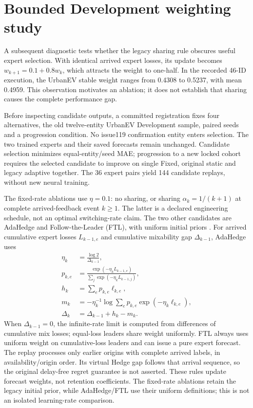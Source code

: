 \documentclass[pdflatex,iicol,sn-mathphys-num]{sn-jnl}
\begin{document}
\FloatBarrier
\section{Bounded Development weighting study}\label{sec:weightfollowup}
A subsequent diagnostic tests whether the legacy sharing rule obscures useful expert selection. With identical arrived expert losses, its update becomes $w_{k+1}=0.1+0.8w_k$, which attracts the weight to one-half. In the recorded 46-ID execution, the UrbanEV stable weight ranges from 0.4308 to 0.5237, with mean 0.4959. This observation motivates an ablation; it does not establish that sharing causes the complete performance gap.

Before inspecting candidate outputs, a committed registration fixes four alternatives, the old twelve-entity UrbanEV Development sample, paired seeds and a progression condition. No issue119 confirmation entity enters selection. The two trained experts and their saved forecasts remain unchanged. Candidate selection minimizes equal-entity/seed MAE; progression to a new locked cohort requires the selected candidate to improve on single Fixed, original static and legacy adaptive together. The 36 expert pairs yield 144 candidate replays, without new neural training.

The fixed-rate ablations use $\eta=0.1$: no sharing, or sharing $\alpha_k=1/(k+1)$ at complete arrived-feedback event $k\geq1$. The latter is a declared engineering schedule, not an optimal switching-rate claim. The two other candidates are AdaHedge and Follow-the-Leader (FTL), with uniform initial priors \cite{rooij2014}. For arrived cumulative expert losses $L_{k-1,e}$ and cumulative mixability gap $\Delta_{k-1}$, AdaHedge uses
\begin{equation}\begin{aligned}
\eta_k&=\frac{\log 2}{\Delta_{k-1}},\\
p_{k,e}&=\frac{\exp(-\eta_k L_{k-1,e})}{\sum_j\exp(-\eta_k L_{k-1,j})},\\
h_k&=\sum_e p_{k,e}\ell_{k,e},\\
m_k&=-\eta_k^{-1}\log\!\sum_e p_{k,e}\exp(-\eta_k\ell_{k,e}),\\
\Delta_k&=\Delta_{k-1}+h_k-m_k.
\end{aligned}\label{eq:adahedge}\end{equation}
When $\Delta_{k-1}=0$, the infinite-rate limit is computed from differences of cumulative mix losses; equal-loss leaders share weight uniformly. FTL always uses uniform weight on cumulative-loss leaders and can issue a pure expert forecast. The replay processes only earlier origins with complete arrived labels, in availability/origin order. Its virtual Hedge gap follows that arrival sequence, so the original delay-free regret guarantee is not asserted. These rules update forecast weights, not retention coefficients. The fixed-rate ablations retain the legacy initial prior, while AdaHedge/FTL use their uniform definitions; this is not an isolated learning-rate comparison.
\end{document}
